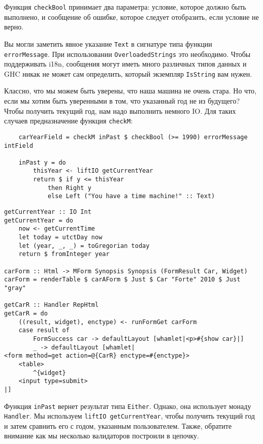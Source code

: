 Функция \lstinline'checkBool' принимает два параметра: условие, которое должно быть
выполнено, и сообщение об ошибке, которое следует отобразить, если условие не верно.
\begin{remark}
Вы могли заметить явное указание \lstinline'Text' в сигнатуре типа функции
\lstinline'errorMessage'. При использовании \lstinline'OverloadedStrings' это
необходимо. Чтобы поддерживать i18n, сообщения могут иметь много различных типов
данных и GHC никак не может сам определить, который экземпляр \lstinline'IsString' вам
нужен.
\end{remark}
Классно, что мы можем быть уверены, что наша машина не очень стара. Но что, если мы хотим
быть уверенными в том, что указанный год не из будущего? Чтобы получить текущий год, нам
надо выполнить немного IO. Для таких случаев предназначение функция \lstinline'checkM':

\begin{lstlisting}
    carYearField = checkM inPast $ checkBool (>= 1990) errorMessage intField

    inPast y = do
        thisYear <- liftIO getCurrentYear
        return $ if y <= thisYear
            then Right y
            else Left ("You have a time machine!" :: Text)
\end{lstlisting}

\begin{lstlisting}
getCurrentYear :: IO Int
getCurrentYear = do
    now <- getCurrentTime
    let today = utctDay now
    let (year, _, _) = toGregorian today
    return $ fromInteger year

carForm :: Html -> MForm Synopsis Synopsis (FormResult Car, Widget)
carForm = renderTable $ carAForm $ Just $ Car "Forte" 2010 $ Just "gray"

getCarR :: Handler RepHtml
getCarR = do
    ((result, widget), enctype) <- runFormGet carForm
    case result of
        FormSuccess car -> defaultLayout [whamlet|<p>#{show car}|]
        _ -> defaultLayout [whamlet|
<form method=get action=@{CarR} enctype=#{enctype}>
    <table>
        ^{widget}
    <input type=submit>
|]
\end{lstlisting}

Функция \lstinline'inPast' вернет результат типа \lstinline'Either'. Однако, она
использует монаду \lstinline'Handler'. Мы используем \lstinline'liftIO getCurrentYear',
чтобы получить текущий год и затем сравнить его с годом, указанным пользователем. Также,
обратите внимание как мы несколько валидаторов построили в цепочку.

